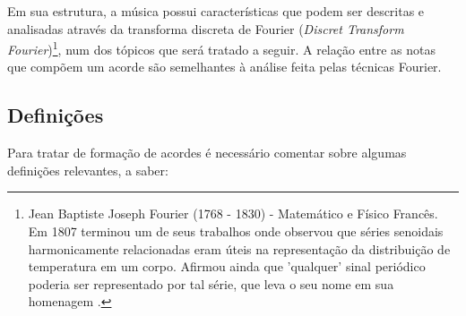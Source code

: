 Em sua estrutura, a música possui características que podem ser descritas e analisadas através da transforma discreta de Fourier (\textit{Discret Transform Fourier})\footnote{Jean Baptiste Joseph Fourier (1768 - 1830) - Matemático e Físico Francês. Em 1807 terminou um de seus trabalhos onde observou que séries senoidais harmonicamente relacionadas eram úteis na representação da distribuição de temperatura em um corpo. Afirmou ainda que 'qualquer' sinal periódico poderia ser representado por tal série, que leva o seu nome em sua homenagem \cite{oppen2010}.}, num dos tópicos que será tratado a seguir. A relação entre as notas que compõem um acorde são semelhantes à análise feita pelas técnicas Fourier.



\subsection{Definições}

Para tratar de formação de acordes é necessário comentar sobre algumas definições relevantes, a saber:

